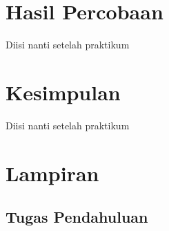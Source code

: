 \section{Hasil Percobaan}
Diisi nanti setelah praktikum

\section{Kesimpulan}
Diisi nanti setelah praktikum

\section{Lampiran}

\subsection{Tugas Pendahuluan}

